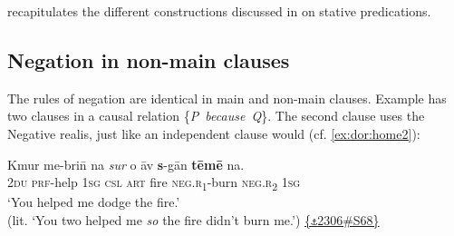 \documentclass[output=paper,colorlinks,citecolor=brown,draft]{langscibook}
\begin{document}
 recapitulates the different constructions discussed in  on stative predications.

\begin{table}
\caption{Negation in some stative predications}
\label{tab:dor:nonverbal}
\end{table}


\subsection{Negation in non-main clauses}
\label{bkm:Ref130736429}\label{sec:dor:2.4}
The rules of negation are identical in main and non-main clauses. Example  has two clauses in a causal relation \{\textit{P~because~Q}\}. The second clause uses the Negative realis, just like an independent clause would (cf. \ref{ex:dor:home2}):


\ea\label{ex:dor:dodge} 
    \gll  Kmur me-bri\={n} na \textit{sur} o āv \textbf{s}-gān \textbf{tēmē} na.\\ 
          \textsc{2du} \textsc{prf}-help \textsc{1sg} \textsc{csl} \textsc{art} fire \textsc{neg.r\textsubscript{1}}-burn \textsc{neg.r\textsubscript{2}} \textsc{1sg}\\
    \glt ‘You helped me dodge the fire.’ \\ (lit. ‘You two helped me \textit{so} the fire didn’t burn me.’) \quad \href{https://doi.org/10.24397/pangloss-0002306#S68}{\{\texttt{⚓}2306\#S68\}}
\z 
\end{document}
